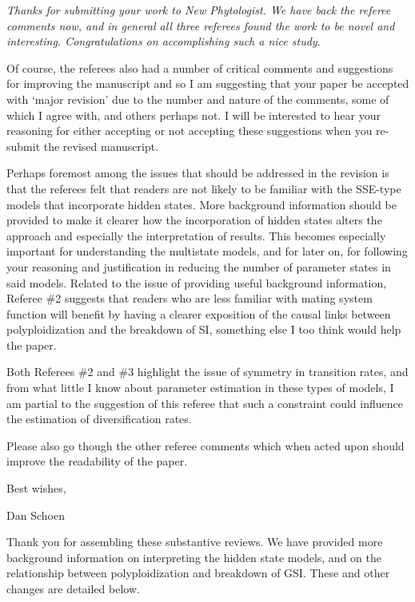 \documentclass[11pt]{article}
\renewenvironment{quote}{\bigskip\noindent\itshape\ignorespaces}{\smallskip}
\begin{document}
\begin{quote}
Thanks for submitting your work to New Phytologist.
We have back the referee comments now, and in general all three referees found the work to be novel and interesting.
Congratulations on accomplishing such a nice study.

Of course, the referees also had a number of critical comments and suggestions for improving the manuscript and so I am suggesting that your paper be accepted with `major revision' due to the number and nature of the comments, some of which I agree with, and others perhaps not.
I will be interested to hear your reasoning for either accepting or not accepting these suggestions when you re-submit the revised manuscript.

Perhaps foremost among the issues that should be addressed in the revision is that the referees felt that readers are not likely to be familiar with the SSE-type models that incorporate hidden states.
More background information should be provided to make it clearer how the incorporation of hidden states alters the approach and especially the interpretation of results.
This becomes especially important for understanding the multistate models, and for later on, for following your reasoning and justification in reducing the number of parameter states in said models.
Related to the issue of providing useful background information, Referee \#2 suggests that readers who are less familiar with mating system function will benefit by having a clearer exposition of the causal links between polyploidization and the breakdown of SI, something else I too think would help the paper.

Both Referees \#2 and \#3 highlight the issue of symmetry in transition rates, and from what little I know about parameter estimation in these types of models, I am partial to the suggestion of this referee that such a constraint could influence the estimation of diversification rates.

Please also go though the other referee comments which when acted upon should improve the readability of the paper.

Best wishes,

Dan Schoen
\end{quote}

Thank you for assembling these substantive reviews.
We have provided more background information on interpreting the hidden state models, and on the relationship between polyploidization and breakdown of GSI.
These and other changes are detailed below.
\end{document}

